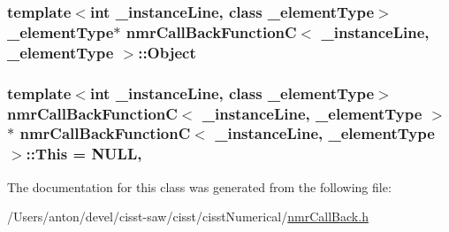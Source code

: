 \subsubsection[{Object}]{\setlength{\rightskip}{0pt plus 5cm}template$<$int \+\_\+instance\+Line, class \+\_\+element\+Type$>$ \+\_\+element\+Type$\ast$ {\bf nmr\+Call\+Back\+Function\+C}$<$ \+\_\+instance\+Line, \+\_\+element\+Type $>$\+::Object\hspace{0.3cm}{\ttfamily [protected]}}\label{classnmr_call_back_function_c_ae7c7d06c6287e05a265c448de2f92693}
\hypertarget{classnmr_call_back_function_c_afbeb6bde7ebc567dc8627ec16475ef52}{}
\subsubsection[{This}]{\setlength{\rightskip}{0pt plus 5cm}template$<$int \+\_\+instance\+Line, class \+\_\+element\+Type$>$ {\bf nmr\+Call\+Back\+Function\+C}$<$ \+\_\+instance\+Line, \+\_\+element\+Type $>$ $\ast$ {\bf nmr\+Call\+Back\+Function\+C}$<$ \+\_\+instance\+Line, \+\_\+element\+Type $>$\+::This = N\+U\+L\+L\hspace{0.3cm}{\ttfamily [static]}, {\ttfamily [protected]}}\label{classnmr_call_back_function_c_afbeb6bde7ebc567dc8627ec16475ef52}


The documentation for this class was generated from the following file\+:\begin{DoxyCompactItemize}
\item 
/\+Users/anton/devel/cisst-\/saw/cisst/cisst\+Numerical/\hyperlink{nmr_call_back_8h}{nmr\+Call\+Back.\+h}\end{DoxyCompactItemize}
